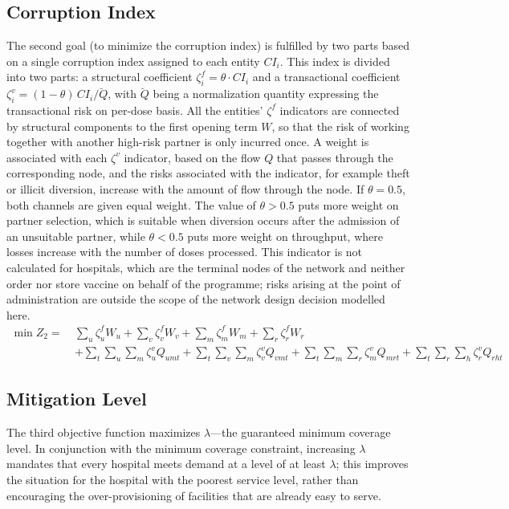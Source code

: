 \documentclass[a4paper]{elsarticle}
\begin{document}
{\subsection{Corruption Index}
The second goal (to minimize the corruption index) is fulfilled by two parts based on a single corruption index assigned to each entity $CI_i$. This index is divided into two parts: a structural coefficient $\zeta^{f}_{i} = \theta \cdot CI_i$ and a transactional coefficient $\zeta^{v}_i = (1-\theta)\, CI_i / \breve{Q}$, with $\breve{Q}$ being a normalization quantity expressing the transactional risk on per-dose basis. All the entities' $\zeta^{f}$ indicators are connected by structural components to the first opening term $W$, so that the risk of working together with another high-risk partner is only incurred once. A weight is associated with each $\zeta^v$ indicator, based on the flow $Q$ that passes through the corresponding node, and the risks associated with the indicator, for example theft or illicit diversion, increase with the amount of flow through the node. If $\theta = 0.5$, both channels are given equal weight. The value of $\theta > 0.5$ puts more weight on partner selection, which is suitable when diversion occurs after the admission of an unsuitable partner, while $\theta < 0.5$ puts more weight on throughput, where losses increase with the number of doses processed. This indicator is not calculated for hospitals, which are the terminal nodes of the network and neither order nor store vaccine on behalf of the programme; risks arising at the point of administration are outside the scope of the network design decision modelled here.
\begin{equation}
\begin{aligned}
\min Z_2 =\
& \sum_{u}\zeta^{f}_u W_u + \sum_{v}\zeta^{f}_v W_v
  + \sum_{m}\zeta^{f}_m W_m + \sum_{r}\zeta^{f}_r W_r \\
& + \sum_{t}\sum_{u}\sum_{m}\zeta^{v}_u Q_{umt}
  + \sum_{t}\sum_{v}\sum_{m}\zeta^{v}_v Q_{vmt}
  + \sum_{t}\sum_{m}\sum_{r}\zeta^{v}_m Q_{mrt}
  + \sum_{t}\sum_{r}\sum_{h}\zeta^{v}_r Q_{rht}
\end{aligned}
\label{eq:corruption}
\end{equation}
\subsection{Mitigation Level}
The third objective function maximizes $\lambda$---the guaranteed minimum coverage level. In conjunction with the minimum coverage constraint, increasing $\lambda$ mandates that every hospital meets demand at a level of at least $\lambda$; this improves the situation for the hospital with the poorest service level, rather than encouraging the over-provisioning of facilities that are already easy to serve.

}
\end{document}
